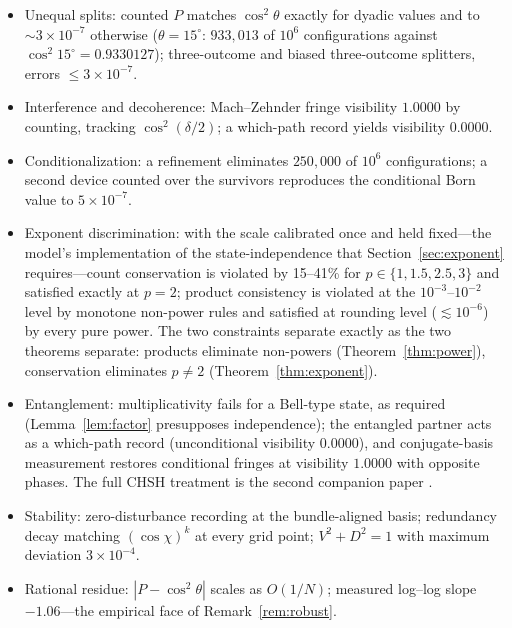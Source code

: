 \documentclass[11pt]{article}
\theoremstyle{definition}
\theoremstyle{remark}
\begin{document}
\begin{itemize}
\item Unequal splits: counted $P$ matches $\cos^2\theta$ exactly for dyadic values and to $\sim 3\times10^{-7}$ otherwise ($\theta = 15^\circ$: $933{,}013$ of $10^6$ configurations against $\cos^2 15^\circ = 0.9330127$); three-outcome and biased three-outcome splitters, errors $\leq 3\times10^{-7}$.
\item Interference and decoherence: Mach--Zehnder fringe visibility $1.0000$ by counting, tracking $\cos^2(\delta/2)$; a which-path record yields visibility $0.0000$.
\item Conditionalization: a refinement eliminates $250{,}000$ of $10^6$ configurations; a second device counted over the survivors reproduces the conditional Born value to $5\times10^{-7}$.
\item Exponent discrimination: with the scale calibrated once and held fixed---the model's implementation of the state-independence that Section~\ref{sec:exponent} requires---count conservation is violated by 15--41\% for $p \in \{1, 1.5, 2.5, 3\}$ and satisfied exactly at $p = 2$; product consistency is violated at the $10^{-3}$--$10^{-2}$ level by monotone non-power rules and satisfied at rounding level ($\lesssim 10^{-6}$) by every pure power. The two constraints separate exactly as the two theorems separate: products eliminate non-powers (Theorem~\ref{thm:power}), conservation eliminates $p \neq 2$ (Theorem~\ref{thm:exponent}).
\item Entanglement: multiplicativity fails for a Bell-type state, as required (Lemma~\ref{lem:factor} presupposes independence); the entangled partner acts as a which-path record (unconditional visibility $0.0000$), and conjugate-basis measurement restores conditional fringes at visibility $1.0000$ with opposite phases. The full CHSH treatment is the second companion paper \cite{TillittCHSH}.
\item Stability: zero-disturbance recording at the bundle-aligned basis; redundancy decay matching $(\cos\chi)^k$ at every grid point; $V^2 + D^2 = 1$ with maximum deviation $3\times10^{-4}$.
\item Rational residue: $|P - \cos^2\theta|$ scales as $O(1/N)$; measured log--log slope $-1.06$---the empirical face of Remark~\ref{rem:robust}.
\end{itemize}
\end{document}
